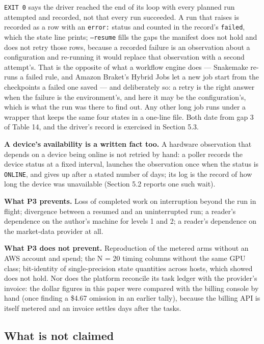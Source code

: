 \documentclass[acmsmall,screen,review]{acmart}
\begin{document}
\texttt{EXIT 0} says the driver reached the end of its loop with every planned run attempted and recorded, not that every run succeeded. A run that raises is recorded as a row with an \texttt{error:} status and counted in the record's \texttt{failed}, which the state line prints; \texttt{--resume} fills the gaps the manifest does not hold and does not retry those rows, because a recorded failure is an observation about a configuration and re-running it would replace that observation with a second attempt's. That is the opposite of what a workflow engine does --- Snakemake \cite{ref21} re-runs a failed rule, and Amazon Braket's Hybrid Jobs \cite{ref42} let a new job start from the checkpoints a failed one saved --- and deliberately so: a retry is the right answer when the failure is the environment's, and here it may be the configuration's, which is what the run was there to find out. Any other long job runs under a wrapper that keeps the same four states in a one-line file. Both date from gap 3 of Table 14, and the driver's record is exercised in Section 5.3.


\textbf{A device's availability is a written fact too.} A hardware observation that depends on a device being online is not retried by hand: a poller records the device status at a fixed interval, launches the observation once when the status is \texttt{ONLINE}, and gives up after a stated number of days; its log is the record of how long the device was unavailable (Section 5.2 reports one such wait).


\textbf{What P3 prevents.} Loss of completed work on interruption beyond the run in flight; divergence between a resumed and an uninterrupted run; a reader's dependence on the author's machine for levels 1 and 2; a reader's dependence on the market-data provider at all.


\textbf{What P3 does not prevent.} Reproduction of the metered arms without an AWS account and spend; the N = 20 timing columns without the same GPU class; bit-identity of single-precision state quantities across hosts, which \cite[Supplementary Sec. S-VI]{ref1} showed does not hold. Nor does the platform reconcile its task ledger with the provider's invoice: the dollar figures in this paper were compared with the billing console by hand (once finding a \$4.67 omission in an earlier tally), because the billing API is itself metered and an invoice settles days after the tasks.


\subsection{What is not claimed}
\end{document}
